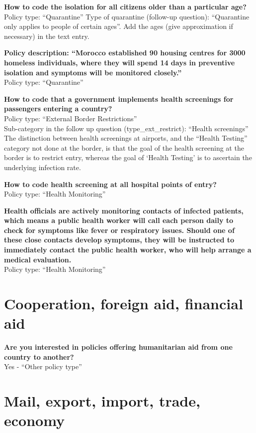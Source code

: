 \documentclass[
]{book}
\begin{document}
\textbf{How to code the isolation for all citizens older than a particular age?}\\
Policy type: ``Quarantine''
Type of quarantine (follow-up question): ``Quarantine only applies to people of certain ages''. Add the ages (give approximation if necessary) in the text entry.

\textbf{Policy description: ``Morocco established 90 housing centres for 3000 homeless individuals, where they will spend 14 days in preventive isolation and symptoms will be monitored closely.''}\\
Policy type: ``Quarantine''

\textbf{How to code that a government implements health screenings for passengers entering a country?}\\
Policy type: ``External Border Restrictions''\\
Sub-category in the follow up question (type\_ext\_restrict): ``Health screenings''\\
The distinction between health screenings at airports, and the ``Health Testing'' category not done at the border, is that the goal of the health screening at the border is to restrict entry, whereas the goal of `Health Testing' is to ascertain the underlying infection rate.

\textbf{How to code health screening at all hospital points of entry?}\\
Policy type: ``Health Monitoring''

\textbf{Health officials are actively monitoring contacts of infected patients, which means a public health worker will call each person daily to check for symptoms like fever or respiratory issues. Should one of these close contacts develop symptoms, they will be instructed to immediately contact the public health worker, who will help arrange a medical evaluation.}\\
Policy type: ``Health Monitoring''

\hypertarget{cooperation-foreign-aid-financial-aid}{%
\section{Cooperation, foreign aid, financial aid}\label{cooperation-foreign-aid-financial-aid}}

\textbf{Are you interested in policies offering humanitarian aid from one country to another?}\\
Yes - ``Other policy type''

\hypertarget{mail-export-import-trade-economy}{%
\section{Mail, export, import, trade, economy}\label{mail-export-import-trade-economy}}
\end{document}

